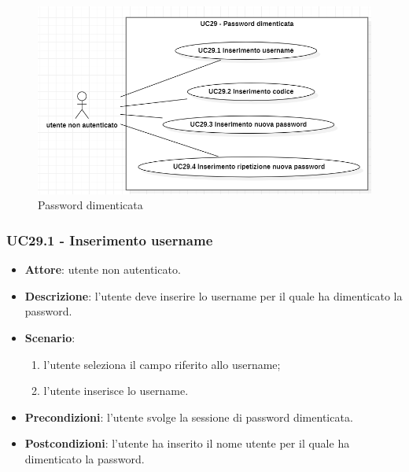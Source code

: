 \begin{figure}[!h]
    \includegraphics[width=15cm]{sezioni/Images/UC29_s.png}
    \centering
    \caption{Password dimenticata}
\end{figure}

\subsubsection{UC29.1 - Inserimento username} 
\begin{itemize}
    \item \textbf{Attore}: utente non autenticato.
    \item \textbf{Descrizione}: l'utente deve inserire lo username per il quale ha dimenticato la password.
    \item \textbf{Scenario}:
    \begin{enumerate}
        \item l'utente seleziona il campo riferito allo username;
        \item l'utente inserisce lo username.
    \end{enumerate}

    \item \textbf{Precondizioni}: l'utente svolge la sessione di password dimenticata.
    \item \textbf{Postcondizioni}: l'utente ha inserito il nome utente per il quale ha dimenticato la password.

\end{itemize}

